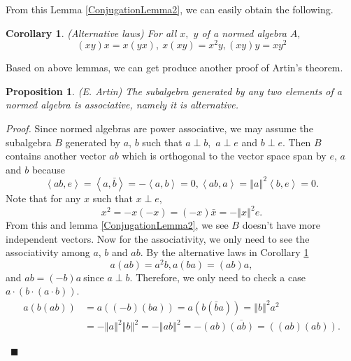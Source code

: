 \documentclass[a4paper]{article}%
\newtheorem{corollary}[theorem]{Corollary}
\newtheorem{proposition}[theorem]{Proposition}
\newenvironment{proof}[1][Proof]{\noindent\textit{#1.} }{}
\begin{document}
From this Lemma \ref{ConjugationLemma2}, we can easily obtain the following.

\begin{corollary}
\label{AlternativeCoro}(Alternative laws) For all $x,$ $y$ of a normed algebra
$A,$%
\[
\left(  xy\right)  x=x\left(  yx\right)  ,\ x\left(  xy\right)  =x^{2}%
y,\left(  xy\right)  y=xy^{2}%
\]

\end{corollary}

Based on above lemmas, we can get produce another proof of Artin's theorem.

\begin{proposition}
\label{Artin}(E. Artin) The subalgebra generated by any two elements of a
normed algebra is associative, namely it is \textit{alternative}.
\end{proposition}

\begin{proof}
Since normed algebras are power associative, we may assume the subalgebra $B$
generated by $a$, $b$ such that $a\perp b,$ $a\perp e$ and $b\perp e$. Then
$B$ contains another vector $ab$ which is orthogonal to the vector space span
by $e$, $a\;$and $b$ because
\[
\left\langle ab,e\right\rangle =\left\langle a,\bar{b}\right\rangle
=-\left\langle a,b\right\rangle =0,\left\langle ab,a\right\rangle =\left\Vert
a\right\Vert ^{2}\left\langle b,e\right\rangle =0.
\]
Note that for any $x$ such that $x\perp e$,
\[
x^{2}=-x\left(  -x\right)  =\left(  -x\right)  \bar{x}=-\left\Vert
x\right\Vert ^{2}e.
\]
From this and lemma \ref{ConjugationLemma2}, we see $B$ doesn't have more
independent vectors. Now for the associativity, we only need to see the
associativity among $a$, $b$ and $ab$. By the alternative laws in Corollary
\ref{AlternativeCoro}%
\[
a\left(  ab\right)  =a^{2}b,a\left(  ba\right)  =\left(  ab\right)  a,
\]
and $ab=\left(  -b\right)  a\ $since $a\perp b$. Therefore, we only need to
check a case $a\cdot\left(  b\cdot\left(  a\cdot b\right)  \right)  $.
\begin{align*}
a\left(  b\left(  ab\right)  \right)   &  =a\left(  \left(  -b\right)  \left(
ba\right)  \right)  =a\left(  b\left(  \bar{b}a\right)  \right)  =\left\Vert
b\right\Vert ^{2}a^{2}\\
&  =-\left\Vert a\right\Vert ^{2}\left\Vert b\right\Vert ^{2}=-\left\Vert
ab\right\Vert ^{2}=-\left(  ab\right)  \overline{\left(  ab\right)  }=\left(
\left(  ab\right)  \left(  ab\right)  \right)  .
\end{align*}


\ $\blacksquare$
\end{proof}
\end{document}
